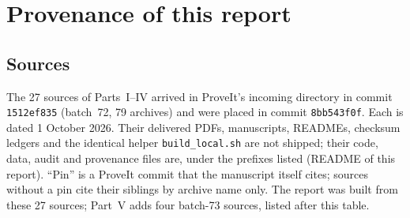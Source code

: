 \documentclass[11pt,a4paper]{article}
\theoremstyle{remark}\newtheorem{remark}[theorem]{Remark}
\begin{document}
\appendix
\section{Provenance of this report}\label{mrn:sec:provenance}

\subsection{Sources}\label{mrn:sec:sources}
The 27 sources of Parts~I--IV arrived in ProveIt's incoming directory in commit
\texttt{1512ef835} (batch~72, 79 archives) and were placed in commit
\texttt{8bb543f0f}. Each is dated 1 October 2026. Their delivered PDFs,
manuscripts, READMEs, checksum ledgers and the identical helper
\texttt{build\_local.sh} are not shipped; their code, data, audit and
provenance files are, under the prefixes listed (README of this report).
``Pin'' is a ProveIt commit that the manuscript itself cites; sources
without a pin cite their siblings by archive name only.
The report was built from these 27 sources; Part~V adds four batch-73
sources, listed after this table.
\end{document}
